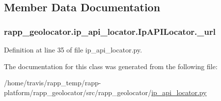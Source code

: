 \subsection{Member Data Documentation}
\hypertarget{classrapp__geolocator_1_1ip__api__locator_1_1IpAPILocator_a6637b729fbd6ad872b140adf91c649bc}{
\subsubsection[{\-\_\-url}]{\setlength{\rightskip}{0pt plus 5cm}rapp\-\_\-geolocator.\-ip\-\_\-api\-\_\-locator.\-Ip\-A\-P\-I\-Locator.\-\_\-url\hspace{0.3cm}{\ttfamily [private]}}}\label{classrapp__geolocator_1_1ip__api__locator_1_1IpAPILocator_a6637b729fbd6ad872b140adf91c649bc}


Definition at line 35 of file ip\-\_\-api\-\_\-locator.\-py.



The documentation for this class was generated from the following file\-:\begin{DoxyCompactItemize}
\item 
/home/travis/rapp\-\_\-temp/rapp-\/platform/rapp\-\_\-geolocator/src/rapp\-\_\-geolocator/\hyperlink{ip__api__locator_8py}{ip\-\_\-api\-\_\-locator.\-py}\end{DoxyCompactItemize}
